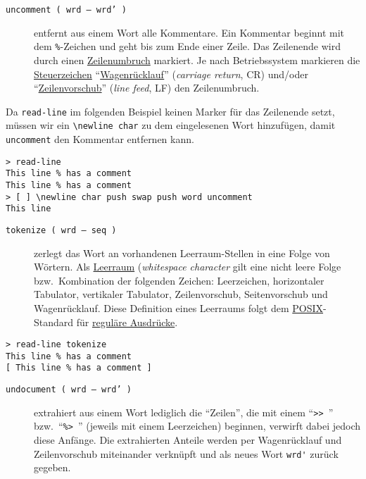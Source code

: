 \begin{description}
\item[\texttt{uncomment ( wrd -- wrd' )}] entfernt aus einem Wort alle Kommentare. Ein Kommentar beginnt mit dem \verb|%|-Zeichen
und geht bis zum Ende einer Zeile. Das Zeilenende wird durch einen \href{http://de.wikipedia.org/wiki/Zeilenumbruch}{Zeilenumbruch} markiert. Je nach Betriebssystem markieren die \href{http://de.wikipedia.org/wiki/Steuerzeichen}{Steuerzeichen} "`\href{http://de.wikipedia.org/wiki/Wagenr\%C3\%BCcklauf}{Wagenrücklauf}"' (\emph{carriage return}, CR) und\slash oder "`\href{http://de.wikipedia.org/wiki/Zeilenvorschub}{Zeilenvorschub}"' (\emph{line feed}, LF) den Zeilenumbruch.
\end{description}

Da \verb|read-line| im folgenden Beispiel keinen Marker für das Zeilenende setzt, müssen wir ein \verb|\newline char| zu dem eingelesenen Wort hinzufügen, damit \verb|uncomment| den Kommentar entfernen kann.

\begin{verbatim}
> read-line
This line % has a comment
This line % has a comment
> [ ] \newline char push swap push word uncomment
This line
\end{verbatim}

\begin{description}
\item[\texttt{tokenize ( wrd -- seq )}] zerlegt das Wort an vorhandenen Leerraum-Stellen in eine Folge von Wörtern.
Als \href{http://de.wikipedia.org/wiki/Leerraum}{Leerraum} (\emph{whitespace character} gilt eine nicht leere Folge bzw.\ Kombination der folgenden Zeichen: Leerzeichen, horizontaler Tabulator, vertikaler Tabulator, Zeilenvorschub, Seitenvorschub und
Wagenrücklauf. Diese Definition eines Leerraums folgt dem \href{http://de.wikipedia.org/wiki/POSIX}{POSIX}-Standard für
\href{http://de.wikipedia.org/wiki/Regul\%C3\%A4rer\_Ausdruck}{reguläre Ausdrücke}.
\end{description}

\begin{verbatim}
> read-line tokenize
This line % has a comment
[ This line % has a comment ]
\end{verbatim}

\begin{description}
\item[\texttt{undocument ( wrd -- wrd' )}] extrahiert aus einem Wort lediglich die "`Zeilen"', die mit einem "`\verb|>> |"' bzw.\ "`\verb|%> |"'
(jeweils mit einem Leerzeichen) beginnen, verwirft dabei jedoch diese Anfänge. Die extrahierten Anteile werden per Wagenrücklauf und Zeilenvorschub miteinander verknüpft und als neues Wort \verb|wrd'| zurück gegeben.
\end{description}

